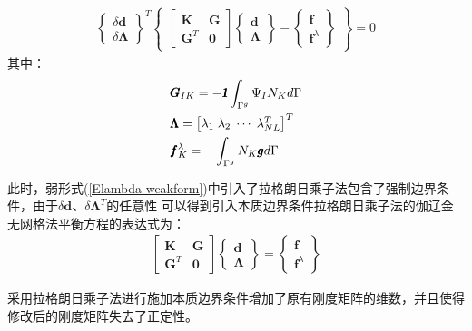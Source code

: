 \begin{equation}
\begin{split}
  \left\{\begin{matrix}\delta\pmb{d}\\\delta\pmb{\Lambda}\end{matrix}\right\}^T
  \left\{\begin{matrix}
  \left[\begin{matrix}\pmb{K}&\pmb{G}\\\pmb{G}^T&\pmb{0}\end{matrix}\right]
  \left\{\begin{matrix}\pmb{d}\\\pmb{\Lambda}\end{matrix}\right\}-
  \left\{\begin{matrix}\pmb{f}\\\pmb{f}^{\lambda}\end{matrix}\right\}
  \end{matrix}\right\}=0
\end{split}
\end{equation}
其中：
\begin{equation}
\begin{split}
    &\pmb{G}_{IK}=-\pmb{\textsl{1}}\int_{\Gamma^g}\Psi_IN_Kd\Gamma\\
    &\pmb{\Lambda}= \left[\begin{matrix}\lambda_1\;\lambda_2\;\dotsb\;\lambda_{NL}^T\end{matrix}\right]^T\\
    &\pmb{f}_K^{\lambda}=-\int_{\Gamma^g}N_K\pmb{g}d\Gamma
\end{split}
\end{equation}\par
此时，弱形式(\ref{Elambda weakform})中引入了拉格朗日乘子法包含了强制边界条件，由于$\delta{\pmb{d}}$、$\delta\pmb{\Lambda}^T$的任意性
可以得到引入本质边界条件拉格朗日乘子法的伽辽金无网格法平衡方程的表达式为：
\begin{equation}
\begin{split}
    \left[\begin{matrix}\pmb{K}&\pmb{G}\\\pmb{G}^T&\pmb{0}\end{matrix}\right]
    \left\{\begin{matrix}\pmb{d}\\\pmb{\Lambda}\end{matrix}\right\}=
    \left\{\begin{matrix}\pmb{f}\\\pmb{f}^{\lambda}\end{matrix}\right\}
\end{split}
\end{equation}\par
采用拉格朗日乘子法进行施加本质边界条件增加了原有刚度矩阵的维数，并且使得修改后的刚度矩阵失去了正定性。
